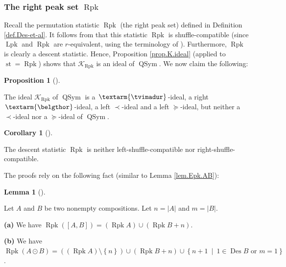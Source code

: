 \documentclass[numbers=enddot,12pt,final,onecolumn,notitlepage]{scrartcl}%
\theoremstyle{definition}
\newtheorem{lem}[theo]{Lemma}
\newenvironment{lemma}[1][]
{\begin{lem}[#1]\begin{leftbar}}
{\end{leftbar}\end{lem}}
\newtheorem{prop}[theo]{Proposition}
\newenvironment{proposition}[1][]
{\begin{prop}[#1]\begin{leftbar}}
{\end{leftbar}\end{prop}}
\newtheorem{coro}[theo]{Corollary}
\newenvironment{corollary}[1][]
{\begin{coro}[#1]\begin{leftbar}}
{\end{leftbar}\end{coro}}
\newenvironment{verlong}{}{}
\newcommand{\tvi}{\left. \textarm{\tvimadur} \right.}
\newcommand{\bel}{\left. \textarm{\belgthor} \right.}
\begin{document}
\begin{verlong}
\subsubsection{The right peak set $\operatorname*{Rpk}$}

Recall the permutation statistic $\operatorname*{Rpk}$ (the right peak set)
defined in Definition \ref{def.Des-et-al}. It follows from \cite[Theorem 4.9
\textbf{(a)} and Theorem 3.5]{part1} that this statistic $\operatorname*{Rpk}$
is shuffle-compatible (since $\operatorname{Lpk}$ and $\operatorname{Rpk}$ are
$r$-equivalent, using the terminology of \cite{part1}). Furthermore,
$\operatorname*{Rpk}$ is clearly a descent statistic. Hence, Proposition
\ref{prop.K.ideal} (applied to $\operatorname{st}=\operatorname*{Rpk}$) shows
that $\mathcal{K}_{\operatorname*{Rpk}}$ is an ideal of $\operatorname*{QSym}%
$. We now claim the following:

\begin{proposition}
\label{prop.Rpk.dend}The ideal $\mathcal{K}_{\operatorname*{Rpk}}$ of
$\operatorname*{QSym}$ is a $\tvi$-ideal, a right $\bel$-ideal, a left
$\left.  \prec\right.  $-ideal and a left $\left.  \succeq\right.  $-ideal,
but neither a $\left.  \prec\right.  $-ideal nor a $\left.  \succeq\right.
$-ideal of $\operatorname*{QSym}$.
\end{proposition}

\begin{corollary}
\label{cor.dendri.Rpk}The descent statistic $\operatorname*{Rpk}$ is neither
left-shuffle-compatible nor right-shuffle-compatible.
\end{corollary}

The proofs rely on the following fact (similar to Lemma \ref{lem.Epk.AB}):

\begin{lemma}
\label{lem.Rpk.AB}Let $A$ and $B$ be two nonempty compositions. Let
$n=\left\vert A\right\vert $ and $m=\left\vert B\right\vert $.

\textbf{(a)} We have $\operatorname*{Rpk}\left(  \left[  A,B\right]  \right)
=\left(  \operatorname*{Rpk}A\right)  \cup\left(  \operatorname*{Rpk}%
B+n\right)  $.

\textbf{(b)} We have $\operatorname*{Rpk}\left(  A\odot B\right)  =\left(
\left(  \operatorname*{Rpk}A\right)  \setminus\left\{  n\right\}  \right)
\cup\left(  \operatorname*{Rpk}B+n\right)  \cup\left\{  n+1\ \mid
\ 1\in\operatorname{Des}B\text{ or }m=1\right\}  $.
\end{lemma}


\end{verlong}
\end{document}
